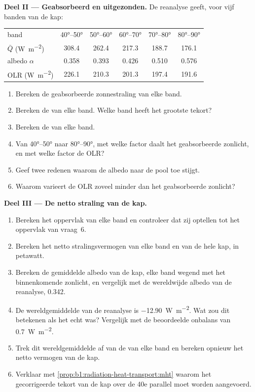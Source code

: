 \begin{problem}
\medskip
\noindent\textbf{Deel II --- Geabsorbeerd en uitgezonden.} De reanalyse geeft, voor vijf banden van de kap:
\begin{center}
\small
\begin{tabular}{|l|ccccc|}
\hline
band & \ang{40}--\ang{50} & \ang{50}--\ang{60} & \ang{60}--\ang{70} & \ang{70}--\ang{80} & \ang{80}--\ang{90} \\
$\bar Q$ (\unit{W.m^{-2}}) & 308.4 & 262.4 & 217.3 & 188.7 & 176.1 \\
albedo $\alpha$ & 0.358 & 0.393 & 0.426 & 0.510 & 0.576 \\
OLR (\unit{W.m^{-2}}) & 226.1 & 210.3 & 201.3 & 197.4 & 191.6 \\
\hline
\end{tabular}
\end{center}
\begin{enumerate}[resume]
  \item Bereken de geabsorbeerde zonnestraling van elke band.
  \item Bereken de  van elke band. Welke band heeft het grootste tekort?
  \item Bereken de  van elke band.
  \item Van \ang{40}--\ang{50} naar \ang{80}--\ang{90}, met welke factor daalt het geabsorbeerde zonlicht, en met welke factor de OLR?
  \item Geef twee redenen waarom de albedo naar de pool toe stijgt.
  \item Waarom varieert de OLR zoveel minder dan het geabsorbeerde zonlicht?
\end{enumerate}

\medskip
\noindent\textbf{Deel III --- De netto straling van de kap.}
\begin{enumerate}[resume]
  \item Bereken het oppervlak van elke band en controleer dat zij optellen tot het oppervlak van vraag~6.
  \item Bereken het netto stralingsvermogen van elke band en van de hele kap, in petawatt.
  \item Bereken de gemiddelde albedo van de kap, elke band wegend met het binnenkomende zonlicht, en vergelijk met de wereldwijde albedo van de reanalyse, \num{0.342}.
  \item De wereldgemiddelde  van de reanalyse is \qty{-12.90}{W.m^{-2}}. Wat zou dit betekenen als het echt was? Vergelijk met de beoordeelde onbalans van \qty{+0.7}{W.m^{-2}}.
  \item Trek dit wereldgemiddelde af van de  van elke band en bereken opnieuw het netto vermogen van de kap.
  \item Verklaar met \cref{prop:b1:radiation-heat-transport:mht} waarom het gecorrigeerde tekort van de kap over de 40e parallel moet worden aangevoerd.
\end{enumerate}


\end{problem}
